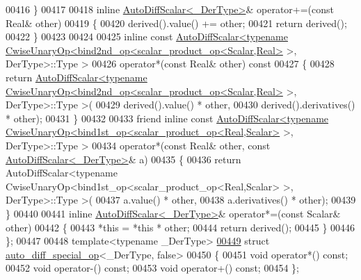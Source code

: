\begin{DoxyCode}
00416   \}
00417 
00418   \textcolor{keyword}{inline} \hyperlink{class_eigen_1_1_auto_diff_scalar}{AutoDiffScalar<\_DerType>}& operator+=(\textcolor{keyword}{const} Real& other)
00419   \{
00420     derived().value() += other;
00421     \textcolor{keywordflow}{return} derived();
00422   \}
00423 
00424 
00425   \textcolor{keyword}{inline} \textcolor{keyword}{const} 
      \hyperlink{class_eigen_1_1_auto_diff_scalar}{AutoDiffScalar<typename CwiseUnaryOp<bind2nd\_op<scalar\_product\_op<Scalar,Real>}
       >, DerType>::Type >
00426   operator*(\textcolor{keyword}{const} Real& other)\textcolor{keyword}{ const}
00427 \textcolor{keyword}{  }\{
00428     \textcolor{keywordflow}{return} 
      \hyperlink{class_eigen_1_1_auto_diff_scalar}{AutoDiffScalar<typename CwiseUnaryOp<bind2nd\_op<scalar\_product\_op<Scalar,Real>}
       >, DerType>::Type >(
00429       derived().value() * other,
00430       derived().derivatives() * other);
00431   \}
00432 
00433   \textcolor{keyword}{friend} \textcolor{keyword}{inline} \textcolor{keyword}{const} 
      \hyperlink{class_eigen_1_1_auto_diff_scalar}{AutoDiffScalar<typename CwiseUnaryOp<bind1st\_op<scalar\_product\_op<Real,Scalar>}
       >, DerType>::Type >
00434   operator*(\textcolor{keyword}{const} Real& other, \textcolor{keyword}{const} \hyperlink{class_eigen_1_1_auto_diff_scalar}{AutoDiffScalar<\_DerType>}& a)
00435   \{
00436     \textcolor{keywordflow}{return} AutoDiffScalar<typename CwiseUnaryOp<bind1st\_op<scalar\_product\_op<Real,Scalar> >, DerType>::Type
       >(
00437       a.value() * other,
00438       a.derivatives() * other);
00439   \}
00440 
00441   \textcolor{keyword}{inline} \hyperlink{class_eigen_1_1_auto_diff_scalar}{AutoDiffScalar<\_DerType>}& operator*=(\textcolor{keyword}{const} Scalar& other)
00442   \{
00443     *\textcolor{keyword}{this} = *\textcolor{keyword}{this} * other;
00444     \textcolor{keywordflow}{return} derived();
00445   \}
00446 \};
00447 
00448 \textcolor{keyword}{template}<\textcolor{keyword}{typename} \_DerType>
\hyperlink{struct_eigen_1_1internal_1_1auto__diff__special__op_3_01___der_type_00_01false_01_4}{00449} \textcolor{keyword}{struct }\hyperlink{struct_eigen_1_1internal_1_1auto__diff__special__op}{auto\_diff\_special\_op}<\_DerType, false>
00450 \{
00451   \textcolor{keywordtype}{void} operator*() \textcolor{keyword}{const};
00452   \textcolor{keywordtype}{void} operator-() \textcolor{keyword}{const};
00453   \textcolor{keywordtype}{void} operator+() \textcolor{keyword}{const};
00454 \};

\end{DoxyCode}
